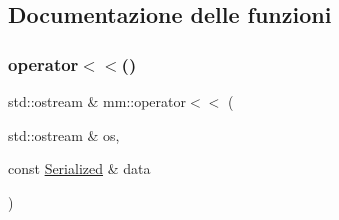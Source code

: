 \subsection{Documentazione delle funzioni}
\mbox{\label{namespacemm_a7ab9a5d20c82db4778995f35e6aa6abb}} 
\subsubsection{\texorpdfstring{operator$<$$<$()}{operator<<()}}
{\footnotesize\ttfamily std\+::ostream \& mm\+::operator$<$$<$ (\begin{DoxyParamCaption}\item[{std\+::ostream \&}]{os,  }\item[{const \hyperlink{structmm_1_1_serialized}{Serialized} \&}]{data }\end{DoxyParamCaption})}

